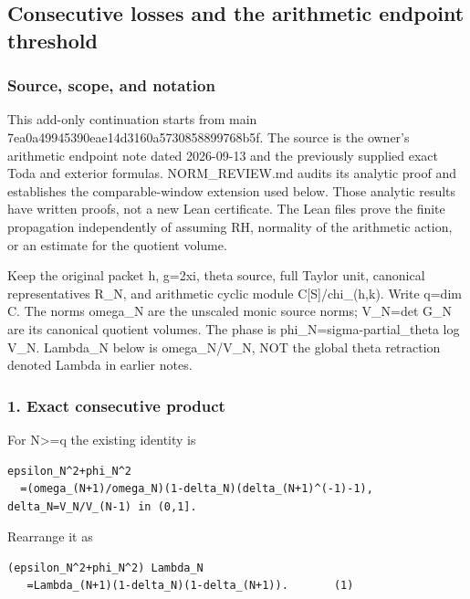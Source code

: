 \subsection{Consecutive losses and the arithmetic endpoint threshold}\label{endpoint-pr25_consecutive_original--consecutive-losses-and-the-arithmetic-endpoint-threshold}

\subsubsection{Source, scope, and notation}\label{endpoint-pr25_consecutive_original--source-scope-and-notation}

This add-only continuation starts from main 7ea0a49945390eae14d3160a5730858899768b5f. The source is the owner's arithmetic endpoint note dated 2026-09-13 and the previously supplied exact Toda and exterior formulas. NORM\_REVIEW.md audits its analytic proof and establishes the comparable-window extension used below. Those analytic results have written proofs, not a new Lean certificate. The Lean files prove the finite propagation independently of assuming RH, normality of the arithmetic action, or an estimate for the quotient volume.

Keep the original packet h, g=2xi, theta source, full Taylor unit, canonical representatives R\_N, and arithmetic cyclic module C{[}S{]}/chi\_(h,k). Write q=dim C. The norms omega\_N are the unscaled monic source norms; V\_N=det G\_N are its canonical quotient volumes. The phase is phi\_N=sigma-partial\_theta log V\_N. Lambda\_N below is omega\_N/V\_N, NOT the global theta retraction denoted Lambda in earlier notes.

\subsubsection{1. Exact consecutive product}\label{endpoint-pr25_consecutive_original--exact-consecutive-product}

For N\textgreater=q the existing identity is

\begin{verbatim}
epsilon_N^2+phi_N^2
  =(omega_(N+1)/omega_N)(1-delta_N)(delta_(N+1)^(-1)-1),
delta_N=V_N/V_(N-1) in (0,1].
\end{verbatim}

Rearrange it as

\begin{verbatim}
(epsilon_N^2+phi_N^2) Lambda_N
   =Lambda_(N+1)(1-delta_N)(1-delta_(N+1)).       (1)
\end{verbatim}

